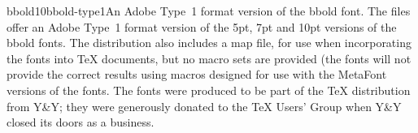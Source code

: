 \documentclass{ddltxtyp}
\begin{document}
\begin{package}{bbold10}{bbold-type1}{An Adobe Type~1 format version of the bbold font.}
The files offer an Adobe Type~1 format version of the 5pt, 7pt
and 10pt versions of the bbold fonts. The distribution also
includes a map file, for use when incorporating the fonts into
TeX documents, but no macro sets are provided (the fonts will
not provide the correct results using macros designed for use
with the MetaFont versions of the fonts. The fonts were
produced to be part of the {\TeX} distribution from Y\&Y; they were
generously donated to the {\TeX} Users' Group when Y\&Y closed its
doors as a business.
\end{package}
\end{document}
